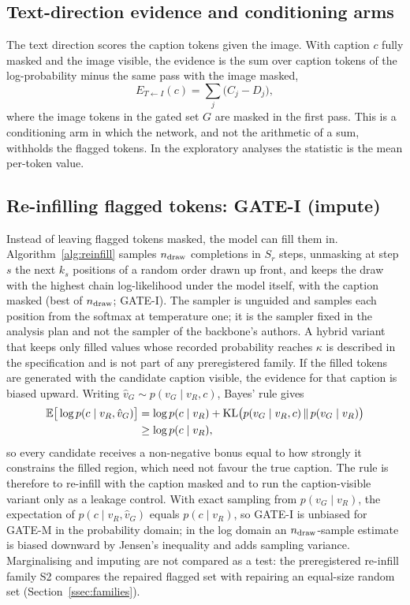 \subsection{Text-direction evidence and conditioning arms}\label{ssec:text}
The text direction scores the caption tokens given the image.
With caption $c$ fully masked and the image visible, the evidence is the sum over caption tokens of the log-probability minus the same pass with the image
masked,
\begin{equation}
E_{T\leftarrow I}(c)=\sum_{j}\big(C_j-D_j\big),
\label{eq:text}
\end{equation}
where the image tokens in the gated set $G$ are masked in the first pass.
This is a conditioning arm in which the network, and not the arithmetic of a sum, withholds the flagged tokens.
In the exploratory analyses the statistic is the mean per-token value.

\subsection{Re-infilling flagged tokens: GATE-I (impute)}\label{ssec:reinfill}
Instead of leaving flagged tokens masked, the model can fill them in.
Algorithm~\ref{alg:reinfill} samples $n_{\rm draw}$ completions in $S_r$ steps, unmasking at step $s$ the next $k_s$ positions
of a random order drawn up front, and keeps the draw with the highest chain log-likelihood under the model itself, with the
caption masked (best of $n_{\rm draw}$; GATE-I).
The sampler is unguided and samples each position from the softmax at temperature one; it is the sampler fixed in the analysis plan
and not the sampler of the backbone's authors.
A hybrid variant that keeps only filled values whose recorded probability reaches $\kappa$ is described in the specification
and is not part of any preregistered family.
If the filled tokens are generated with the candidate caption visible, the evidence for that caption is biased upward.
Writing $\hat v_G\sim p(v_G\mid v_R,c)$, Bayes' rule gives
\begin{align}
\mathbb{E}\big[\log p(c\mid v_R,\hat v_G)\big]&=\log p(c\mid v_R)+\mathrm{KL}\big(p(v_G\mid v_R,c)\,\|\,p(v_G\mid v_R)\big)\notag\\
&\ge\log p(c\mid v_R),
\label{eq:leak}
\end{align}
so every candidate receives a non-negative bonus equal to how strongly it constrains the filled region, which need not favour the
true caption.
The rule is therefore to re-infill with the caption masked and to run the caption-visible variant only as a leakage control.
With exact sampling from $p(v_G\mid v_R)$, the expectation of $p(c\mid v_R,\hat v_G)$ equals $p(c\mid v_R)$, so GATE-I
is unbiased for GATE-M in the probability domain; in the log domain an $n_{\rm draw}$-sample estimate is biased downward by
Jensen's inequality and adds sampling variance.
Marginalising and imputing are not compared as a test: the preregistered re-infill family S2 compares the repaired flagged set
with repairing an equal-size random set (Section~\ref{ssec:families}).


